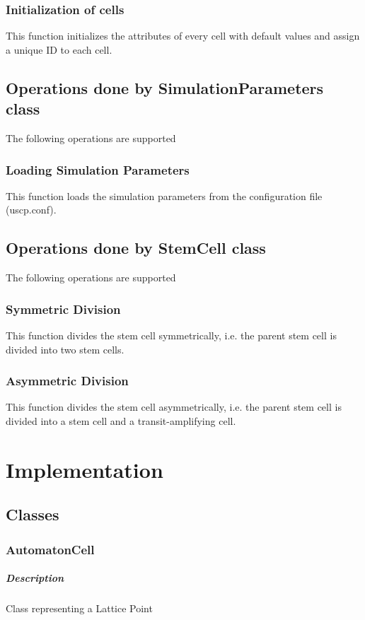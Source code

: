 \documentclass[11pt]{report}
\begin{document}
  \subsection{\color{blue}Initialization of cells}
  This function initializes the attributes of every cell with default values and assign a unique ID to each cell.
  
  \section{\color{red} Operations done by SimulationParameters class}
  The following operations are supported
  \subsection{\color{blue}Loading Simulation Parameters}
  This function loads the simulation parameters from the configuration file (uscp.conf).
  
  \section{\color{red} Operations done by StemCell class}
  The following operations are supported
  \subsection{\color{blue}Symmetric Division}
  This function divides the stem cell symmetrically, i.e. the parent stem cell is divided into two stem cells.
  \subsection{\color{blue}Asymmetric Division}
  This function divides the stem cell asymmetrically, i.e. the parent stem cell is divided into a stem cell and a transit-amplifying cell.
  
  \chapter{Implementation}
  \section{\color{red}Classes}
  \subsection{\color{blue}AutomatonCell}
  \paragraph{Description}
  Class representing a Lattice Point
\end{document}
